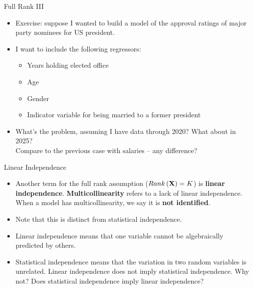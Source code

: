 \documentclass[aspectratio=169,11pt]{beamer}
\begin{document}
\begin{frame}{Full Rank III}
\begin{itemize}

	\item Exercise: suppose I wanted to build a model of the approval ratings of major party nominees 
	for US president. 

	\item I want to include the following regressors:
	\begin{itemize}
		\item Years holding elected office
		\item Age
		\item Gender
		\item Indicator variable for being married to a former president
	\end{itemize}

	\item What's the problem, assuming I have data through 2020? What about in 2025? \\ Compare to the previous case with salaries -- any difference? 



\end{itemize}
\end{frame}

\begin{frame}{Linear Independence}
\begin{itemize}

	\item Another term for the full rank assumption ($Rank\left({\bf X}\right)=K$) is {\bf linear independence}.
	 {\bf Multicollinearity} refers to a lack of linear independence. When a model has multicollinearity, we 
  	say it is {\bf not identified}. 

	\medskip
	\item Note that this is distinct from statistical independence. 

	\medskip
	\item Linear independence means that one variable cannot be algebraically predicted by others. 

	\medskip
	\item Statistical independence means that the variation in two random variables is unrelated.
	Linear independence does not imply statistical independence. Why not? Does statistical independence
	imply linear independence? 
\end{itemize}
\end{frame}
\end{document}
